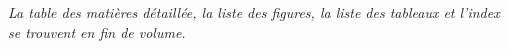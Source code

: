 \setcounter{tocdepth}{0}
\tableofcontents

\cleardoublepage

\begingroup
\let\clearpage\relax
\let\cleardoublepage\relax


\medskip

{\small\noindent\textit{La table des matières détaillée, la liste des figures, la liste des tableaux et l'index se trouvent en fin de volume.}}

\endgroup
